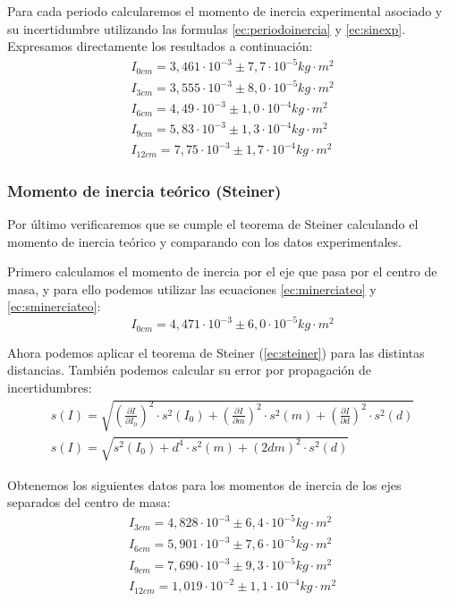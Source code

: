 \documentclass[12pt, a4paper, titlepage]{article}
\begin{document}
  Para cada periodo calcularemos el momento de inercia experimental asociado y su incertidumbre utilizando las formulas \ref{ec:periodoinercia} y \ref{ec:sinexp}. Expresamos directamente los resultados a continuación:
  \begin{gather*}
    I_{0cm} = 3,461 \cdot 10^{-3} \pm 7,7 \cdot 10^{-5} kg \cdot m^2 \\
    I_{3cm} = 3,555 \cdot 10^{-3} \pm 8,0 \cdot 10^{-5} kg \cdot m^2 \\
    I_{6cm} = 4,49 \cdot 10^{-3} \pm 1,0 \cdot 10^{-4} kg \cdot m^2 \\
    I_{9cm} = 5,83 \cdot 10^{-3} \pm 1,3 \cdot 10^{-4} kg \cdot m^2 \\
    I_{12cm} = 7,75 \cdot 10^{-3} \pm 1,7 \cdot 10^{-4} kg \cdot m^2
  \end{gather*}

  \subsubsection{Momento de inercia teórico (Steiner)}

  Por último verificaremos que se cumple el teorema de Steiner calculando el momento de inercia teórico y comparando con los datos experimentales.

  Primero calculamos el momento de inercia por el eje que pasa por el centro de masa, y para ello podemos utilizar las ecuaciones \ref{ec:minerciateo} y \ref{ec:sminerciateo}:
  \begin{equation*}
    I_{0cm} = 4,471 \cdot 10^{-3} \pm 6,0 \cdot 10^{-5} kg \cdot m^2
  \end{equation*}

  Ahora podemos aplicar el teorema de Steiner (\ref{ec:steiner}) para las distintas distancias. También podemos calcular su error por propagación de incertidumbres:
  \begin{gather}
    s(I) = \sqrt{\left( \frac{\partial I}{\partial I_0} \right)^2 \cdot s^2(I_0) + \left( \frac{\partial I}{\partial m} \right)^2 \cdot s^2(m) + \left( \frac{\partial I}{\partial d} \right)^2 \cdot s^2(d)} \nonumber \\
    s(I) = \sqrt{s^2(I_0) + d^4 \cdot s^2(m) + \left( 2 d m \right)^2 \cdot s^2(d)} \label{ec:ssteiner}
  \end{gather}

  Obtenemos los siguientes datos para los momentos de inercia de los ejes separados del centro de masa:
  \begin{gather*}
    I_{3cm} = 4,828 \cdot 10^{-3} \pm 6,4 \cdot 10^{-5} kg \cdot m^2 \\
    I_{6cm} = 5,901 \cdot 10^{-3} \pm 7,6 \cdot 10^{-5} kg \cdot m^2 \\
    I_{9cm} = 7,690 \cdot 10^{-3} \pm 9,3 \cdot 10^{-5} kg \cdot m^2 \\
    I_{12cm} = 1,019 \cdot 10^{-2} \pm 1,1 \cdot 10^{-4} kg \cdot m^2
  \end{gather*}
\end{document}
